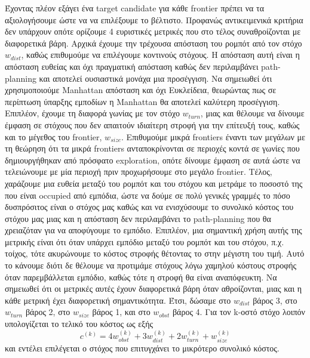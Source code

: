 Έχοντας πλέον εξάγει ένα target candidate για κάθε frontier πρέπει να τα αξιολογήσουμε ώστε να να
επιλέξουμε το βέλτιστο. Προφανώς αντικειμενικά κριτήρια δεν υπάρχουν οπότε ορίζουμε 4 ευριστικές 
μετρικές που στο τέλος συναθροίζονται με διαφορετικά βάρη. Αρχικά έχουμε την τρέχουσα απόσταση του 
ρομπότ από τον στόχο $w_{dist}$, καθώς επιθυμούμε να επιλέγουμε κοντινούς στόχους. Η απόσταση 
αυτή είναι η απόσταση ευθείας και όχι πραγματική απόσταση καθώς δεν περιλαμβάνει path-planning και 
αποτελεί ουσιαστικά μονάχα μια προσέγγιση. Να σημειωθεί ότι χρησιμοποιούμε Manhattan απόσταση και 
όχι Ευκλείδεια, θεωρώντας πως σε περίπτωση ύπαρξης εμποδίων η Manhattan θα αποτελεί καλύτερη 
προσέγγιση. Επιπλέον, έχουμε τη διαφορά γωνίας με τον στόχο $w_{turn}$, μιας και θέλουμε να δίνουμε 
έμφαση σε στόχους που δεν απαιτούν ιδιαίτερη στροφή για την επίτευξή τους, καθώς και το μέγεθος του 
frontier, $w_{size}$. Επιθυμούμε μικρά frontiers έναντι των μεγάλων με τη θεώρηση ότι τα μικρά 
frontiers ανταποκρίνονται σε περιοχές κοντά σε γωνίες που δημιουργήθηκαν από πρόσφατο exploration, 
οπότε δίνουμε έμφαση σε αυτά ώστε να τελειώνουμε με μία περιοχή πριν προχωρήσουμε στο μεγάλο 
frontier. Τέλος, χαράζουμε μια ευθεία μεταξύ του ρομπότ και του στόχου και μετράμε το ποσοστό της 
που είναι occupied από εμπόδια, ώστε να δούμε σε πολύ γενικές γραμμές το πόσο δυσπρόσιτος είναι ο 
στόχος μας καθώς και να ενισχύσουμε το συνολικό κόστος του στόχου μας μιας και η απόσταση δεν 
περιλαμβάνει το path-planning που θα χρειαζόταν για να αποφύγουμε το εμπόδιο. Επιπλέον, μια 
σημαντική χρήση αυτής της μετρικής είναι ότι όταν υπάρχει εμπόδιο μεταξύ του ρομπότ και του στόχου, 
π.χ. τοίχος, τότε ακυρώνουμε το κόστος στροφής θέτοντας το στην μέγιστη του τιμή. Αυτό το κάνουμε
διότι δε θέλουμε να προτιμάμε στόχους λόγω χαμηλού κόστους στροφής όταν παρεμβάλλεται εμπόδιο,
καθώς τότε η στροφή θα είναι αναπόφευκτη. Να σημειωθεί ότι οι μετρικές αυτές έχουν διαφορετικά βάρη
όταν αθροίζονται, μιας και η κάθε μετρική έχει διαφορετική σημαντικότητα. Έτσι, δώσαμε στο 
$w_{dist}$ βάρος 3, στο $w_{turn}$ βάρος 2, στο $w_{size}$ βάρος 1, και στο $w_{obst}$ βάρος 4. Για 
τον k-οστό στόχο λοιπόν υπολογίζεται το τελικό του κόστος ως εξής
$$ c^{(k)} = 4w_{obst}^{(k)} + 3w_{dist}^{(k)} + 2w_{turn}^{(k)} + w_{size}^{(k)}$$
και εντέλει επιλέγεται ο στόχος που επιτυγχάνει το μικρότερο συνολικό κόστος.

